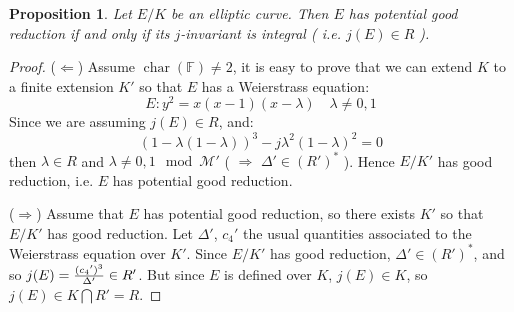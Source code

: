 \documentclass[12pt]{article}
\newtheorem*{prop}{Proposition}
\theoremstyle{definition}
\newcommand{\M}{\mathcal{M}}
\newcommand{\ka}{\mathbb{F}}
\newcommand{\cara}{\operatorname{char}}
\begin{document}
\begin{prop}
Let $E/K$ be an elliptic curve. Then $E$ has
potential good reduction if and only if its $j$-invariant is
integral ( i.e. $j(E)\in R$ ).
\end{prop}
\begin{proof}
($\Leftarrow$) Assume $\cara(\ka)\neq 2$, it is easy to prove
that we can extend $K$ to a finite extension $K'$ so that
$E$ has a Weierstrass equation:
\begin{equation}
E:y^2=x(x-1)(x-\lambda)\quad \lambda\neq 0,1
\end{equation}
Since we are assuming $j(E)\in R$, and:
\begin{equation}
(1-\lambda(1-\lambda))^3-j{\lambda}^2(1-\lambda)^2=0
\end{equation}
then $\lambda\in R$ and $\lambda\neq 0,1 \mod \M'$ (
$\Rightarrow$ $\Delta '\in (R')^*$ ). Hence $E/K'$ has
good reduction, i.e. $E$ has potential good
reduction.

($\Rightarrow$) Assume that $E$ has potential good reduction,
so there exists $K'$ so that $E/K'$ has good
reduction. Let $\Delta'$, $c_4'$ the usual quantities associated
to the Weierstrass equation over $K'$. Since $E/K'$ has good reduction, $\Delta '\in
(R')^*$, and so $j(E)={{({c_4}')^3}\over {\Delta '}}\in
R'$. But since $E$ is defined over $K$, $j(E)\in K$, so $j(E)\in K\bigcap{R'}=R$.
\end{proof}
\end{document}
